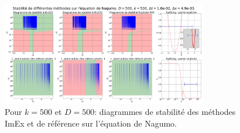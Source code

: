                 \begin{figure}[htbp]
                    \centering
                    \includegraphics[width=0.8\textwidth]{media/4_travail/2_nagumo/stabilite/STABILITE_D500_k500_dt1.0e-02_dx4.9e-03.png}
                    \caption{Pour $k=500$ et $D=500$: diagrammes de stabilité des méthodes ImEx et de référence sur l'équation de Nagumo.}
                    \label{fig:stabilite_nagumo_cas_special}
                \end{figure}
                